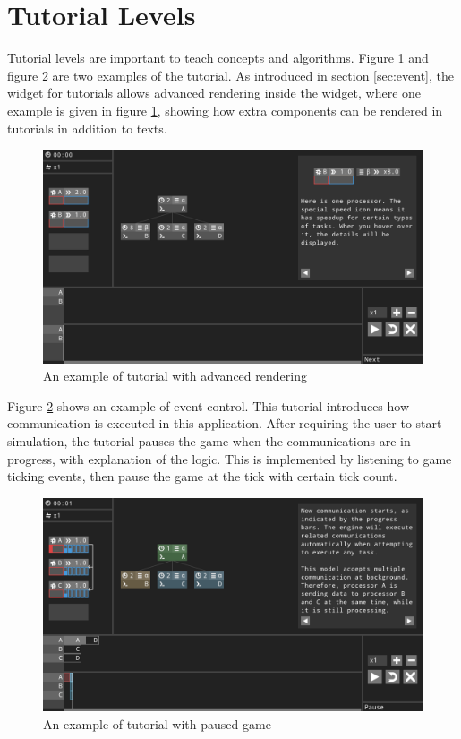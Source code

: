 \documentclass[msc,deptreport, cs]{infthesis}
\begin{document}
\section{Tutorial Levels}

Tutorial levels are important to teach concepts and algorithms. Figure \ref{fig:play4} and figure \ref{fig:play5} are two examples of the tutorial. As introduced in section \ref{sec:event}, the widget for tutorials allows advanced rendering inside the widget, where one example is given in figure \ref{fig:play4}, showing how extra components can be rendered in tutorials in addition to texts. 

\begin{figure}[!htb]
  \centering
  \includegraphics[width=\columnwidth]{play4.png}
  \caption{An example of tutorial with advanced rendering}
  \label{fig:play4}
\end{figure}

Figure \ref{fig:play5} shows an example of event control. This tutorial introduces how communication is executed in this application. After requiring the user to start simulation, the tutorial pauses the game when the communications are in progress, with explanation of the logic. This is implemented by listening to game ticking events, then pause the game at the tick with certain tick count.

\begin{figure}[!htb]
  \centering
  \includegraphics[width=\columnwidth]{play5.png}
  \caption{An example of tutorial with paused game}
  \label{fig:play5}
\end{figure}
\end{document}
